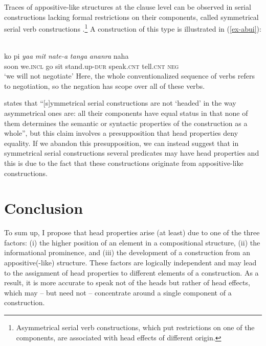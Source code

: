 \documentclass[output=paper,nobabel,draftmode  ,colorlinks, citecolor=brown]{langscibook}
\begin{document}
\noindent
Traces of appositive-like structures at the clause level can be observed in serial constructions
lacking formal restrictions on their components, called symmetrical serial verb constructions
\citep[3]{Aikhenvald2003}.\footnote{Asymmetrical serial verb constructions, which put restrictions
  on one of the components, are associated with head effects of different origin.}  A construction
of this type is illustrated in (\ref{ex-abui}): 

\ea\label{ex-abui} 
\\
\gll ko pi \emph{yaa} \emph{mit} \emph{nate-a} \emph{tanga} \emph{ananra} naha  \\ 
     soon    we.\textsc{incl}	  go	sit	stand.up-\textsc{dur}  speak.\textsc{cnt} tell.\textsc{cnt}	\textsc{neg} \\
\glt `we will not negotiate'
\z
Here, the whole conventionalized sequence of verbs
refers to negotiation, so the negation has scope over all of these verbs. 


\citet*[22]{Aikhenvald2006} states that ``[s]ymmetrical serial constructions are not `headed' in the way asymmetrical ones are: all their components have equal status in that none of them determines the semantic or syntactic properties of the construction as a whole'', but this claim involves a presupposition that head properties deny equality. If we abandon this presupposition, we can instead suggest that in symmetrical serial constructions several predicates may have head properties and this is due to the fact that these constructions originate from appositive-like constructions.

\section{Conclusion}\label{sec-conclu-lan}

To sum up, I propose that head properties arise (at least) due to one of the three factors: (i) the
higher position of an element in a compositional structure, (ii) the informational prominence, and
(iii) the development of a construction from an appositive(-like) structure. These factors are
logically independent and may lead to the assignment of head properties to different elements of a
construction. As a result, it is more accurate to speak not of the heads but rather of head effects,
which may – but need not – concentrate around a single component of a construction. 
\end{document}
